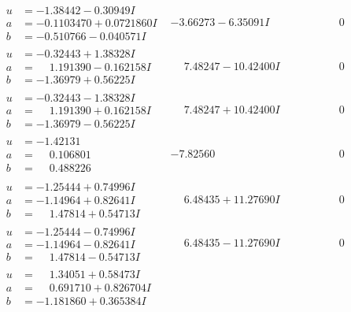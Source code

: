 \documentclass[1p]{elsarticle_modified}
\theoremstyle{definition}
\begin{document}
$$\begin{array}{c|c|c}
\begin{aligned}
u &= -1.38442 - 0.30949 I \\
a &= -0.1103470 + 0.0721860 I \\
b &= -0.510766 - 0.040571 I\end{aligned}
 & -3.66273 - 6.35091 I & \phantom{-0.000000 } 0 \\ \hline\begin{aligned}
u &= -0.32443 + 1.38328 I \\
a &= \phantom{-}1.191390 - 0.162158 I \\
b &= -1.36979 + 0.56225 I\end{aligned}
 & \phantom{-}7.48247 - 10.42400 I & \phantom{-0.000000 } 0 \\ \hline\begin{aligned}
u &= -0.32443 - 1.38328 I \\
a &= \phantom{-}1.191390 + 0.162158 I \\
b &= -1.36979 - 0.56225 I\end{aligned}
 & \phantom{-}7.48247 + 10.42400 I & \phantom{-0.000000 } 0 \\ \hline\begin{aligned}
u &= -1.42131\phantom{ +0.000000I} \\
a &= \phantom{-}0.106801\phantom{ +0.000000I} \\
b &= \phantom{-}0.488226\phantom{ +0.000000I}\end{aligned}
 & -7.82560\phantom{ +0.000000I} & \phantom{-0.000000 } 0 \\ \hline\begin{aligned}
u &= -1.25444 + 0.74996 I \\
a &= -1.14964 + 0.82641 I \\
b &= \phantom{-}1.47814 + 0.54713 I\end{aligned}
 & \phantom{-}6.48435 + 11.27690 I & \phantom{-0.000000 } 0 \\ \hline\begin{aligned}
u &= -1.25444 - 0.74996 I \\
a &= -1.14964 - 0.82641 I \\
b &= \phantom{-}1.47814 - 0.54713 I\end{aligned}
 & \phantom{-}6.48435 - 11.27690 I & \phantom{-0.000000 } 0 \\ \hline\begin{aligned}
u &= \phantom{-}1.34051 + 0.58473 I \\
a &= \phantom{-}0.691710 + 0.826704 I \\
b &= -1.181860 + 0.365384 I\end{aligned}

\end{array}$$
\end{document}
